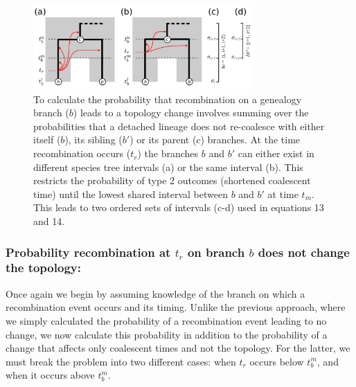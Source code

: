\documentclass[11pt]{article}
\begin{document}

\begin{figure}[t]
	\centering
	\includegraphics[width=0.75\textwidth]{figures/FigS1-sibling-parent-it2.pdf}
	\caption{
		To calculate the probability that recombination on a genealogy branch
		($b$) leads to a topology change involves summing over the probabilities 
		that a detached lineage does not re-coalesce with either
		itself ($b$), its sibling ($b'$) or its parent ($c$) branches. At the time 
		recombination occurs ($t_r$) the branches $b$ and $b'$ can either exist 
		in different species tree intervals (a) or the same interval (b). This 
		restricts the probability of type 2 outcomes (shortened coalescent time) 
		until the lowest shared interval between $b$ and $b'$ at time $t_m$. 
		This leads to two ordered sets of intervals (c-d) used in 
		equations 13 and 14.
	}
	\label{fig:fig3}
\end{figure}

\subsubsection{Probability recombination at $t_r$ on branch $b$ does not change the topology:}
Once again we begin by assuming knowledge of the branch on which a recombination event occurs 
and its timing.
Unlike the previous approach, %
where we 
simply %
calculated the probability of 
a recombination event leading to no change, we now 
calculate this probability in addition to the probability of a change that
affects only coalescent times and not the topology. 
For the latter, we must 
break the problem into two different cases: 
when $t_r$ occurs below $t_b^m$, and when it occurs above $t_b^m$.
\end{document}
